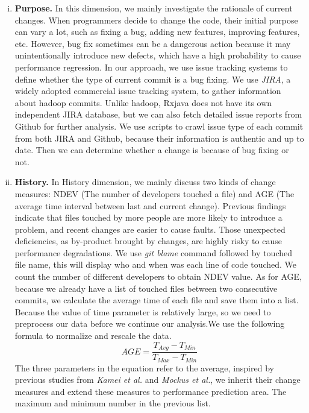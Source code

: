 \begin{enumerate}[(i)]
	\item \noindent
	\textbf{Purpose.}
	In this dimension, we mainly investigate the rationale of current changes. When programmers decide to change the code, their initial purpose can vary a lot, such as fixing a bug, adding new features, improving features, etc.
	However, bug fix sometimes can be a dangerous action because it may unintentionally introduce new defects, which have a high probability to cause performance regression. In our approach, we use issue tracking systems to define whether the type of current commit is a bug fixing. We use \textit{JIRA}, a widely adopted commercial issue tracking system, to gather information about hadoop commits. Unlike hadoop, Rxjava does not have its own independent JIRA database, but we can also fetch detailed issue reports from Github for further analysis. We use scripts to crawl issue type of each commit from both JIRA and Github, because their information is authentic and up to date. Then we can determine whether a change is because of bug fixing or not.
	
	\item \noindent
	\textbf{History.}
	In History dimension, we mainly discuss two kinds of change measures: NDEV (The number of developers touched a file) and AGE (The average time interval between last and current change). Previous findings indicate that files touched by more people are more likely to introduce a problem\cite{matsumoto2010analysis}, and recent changes are easier to cause faults\cite{eick2001does}. Those unexpected deficiencies, as by-product brought by changes, are highly risky to cause performance degradations. We use \textit{git blame} command followed by touched file name, this will display who and when was each line of code touched. We count the number of different developers to obtain NDEV value. As for AGE, because we already have a list of touched files between two consecutive commits, we calculate the average time of each file and save them into a list. Because the value of time parameter is relatively large, so we need to preprocess our data before we continue our analysis.We use the following formula to normalize and rescale the data.
	\begin{equation}
		AGE = \frac{T_{Avg}-T_{Min}}{T_{Max}-T_{Min}}
	\end{equation}
	The three parameters in the equation refer to the average, inspired by previous studies from \textit{Kamei et al.} and \textit{Mockus et al.}, we inherit their change measures and extend these measures to performance prediction area. The maximum and minimum number in the previous list. 
	

\end{enumerate}
